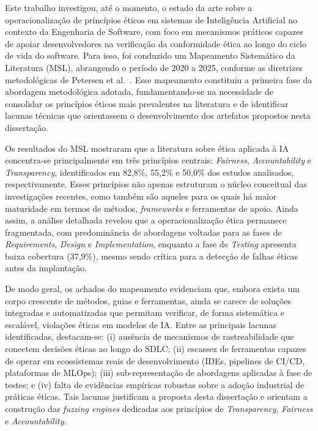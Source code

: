 \label{cap:conclusao}

Este trabalho investigou, até o momento, o estado da arte sobre a operacionalização de princípios éticos em sistemas de Inteligência Artificial no contexto da Engenharia de Software, com foco em mecanismos práticos capazes de apoiar desenvolvedores na verificação da conformidade ética ao longo do ciclo de vida do software. Para isso, foi conduzido um Mapeamento Sistemático da Literatura (MSL), abrangendo o período de 2020 a 2025, conforme as diretrizes metodológicas de Petersen et al.~\cite{Petersen2015}. Esse mapeamento constituiu a primeira fase da abordagem metodológica adotada, fundamentando-se na necessidade de consolidar os princípios éticos mais prevalentes na literatura e de identificar lacunas técnicas que orientassem o desenvolvimento dos artefatos propostos nesta dissertação.

Os resultados do MSL mostraram que a literatura sobre ética aplicada à IA concentra-se principalmente em três princípios centrais: \textit{Fairness}, \textit{Accountability} e \textit{Transparency}, identificados em 82,8\%, 55,2\% e 50,0\% dos estudos analisados, respectivamente. Esses princípios não apenas estruturam o núcleo conceitual das investigações recentes, como também são aqueles para os quais há maior maturidade em termos de métodos, \textit{frameworks} e ferramentas de apoio. Ainda assim, a análise detalhada revelou que a operacionalização ética permanece fragmentada, com predominância de abordagens voltadas para as fases de \textit{Requirements}, \textit{Design} e \textit{Implementation}, enquanto a fase de \textit{Testing} apresenta baixa cobertura (37,9\%), mesmo sendo crítica para a detecção de falhas éticas antes da implantação.

De modo geral, os achados do mapeamento evidenciam que, embora exista um corpo crescente de métodos, guias e ferramentas, ainda se carece de soluções integradas e automatizadas que permitam verificar, de forma sistemática e escalável, violações éticas em modelos de IA. Entre as principais lacunas identificadas, destacam-se: (i) ausência de mecanismos de rastreabilidade que conectem decisões éticas ao longo do SDLC; (ii) escassez de ferramentas capazes de operar em ecossistemas reais de desenvolvimento (IDEs, pipelines de CI/CD, plataformas de MLOps); (iii) sub-representação de abordagens aplicadas à fase de testes; e (iv) falta de evidências empíricas robustas sobre a adoção industrial de práticas éticas. Tais lacunas justificam a proposta desta dissertação e orientam a construção das \textit{fuzzing engines} dedicadas aos princípios de \textit{Transparency}, \textit{Fairness} e \textit{Accountability}.

